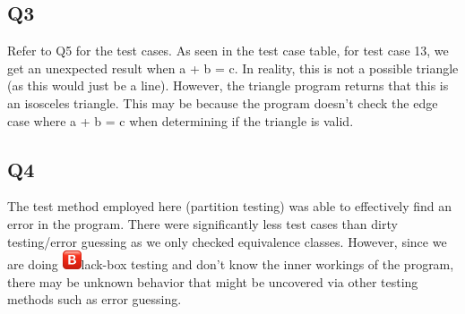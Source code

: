 \documentclass[12pt, letterpaper, titlepage]{article}
\newcommand{\B}{\includegraphics[height=1.5em, valign=B, raise=-0.2em]{BigB.png}}
\begin{document}
\subsection*{Q3}
Refer to Q5 for the test cases. As seen in the test case table, for test case 13, we get an unexpected result when a + b = c. In reality, this is not a possible triangle (as this would just be a line). However, the triangle program returns that this is an isosceles triangle. This may be because the program doesn't check the edge case where a + b = c when determining if the triangle is valid.

\subsection*{Q4}
The test method employed here (partition testing) was able to effectively find an error in the program. There were significantly less test cases than dirty testing/error guessing as we only checked equivalence classes. However, since we are doing \B lack-box testing and don't know the inner workings of the program, there may be unknown behavior that might be uncovered via other testing methods such as error guessing. 
\end{document}
